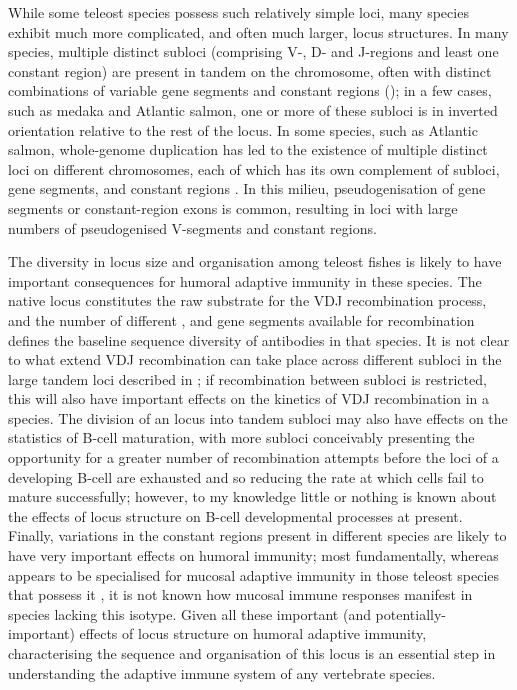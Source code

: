 While some teleost species possess such relatively simple \igh{} loci, many species exhibit much more complicated, and often much larger, locus structures. In many species, multiple distinct subloci (comprising V-, D- and J-regions and least one constant region) are present in tandem on the chromosome, often with distinct combinations of variable gene segments and constant regions (); in a few cases, such as medaka and Atlantic salmon, one or more of these subloci is in inverted orientation relative to the rest of the locus. In some species, such as Atlantic salmon, whole-genome duplication has led to the existence of multiple distinct \igh{} loci on different chromosomes, each of which has its own complement of subloci, gene segments, and constant regions \parencite{yasuike2010salmon}. In this milieu, pseudogenisation of gene segments or constant-region exons is common, resulting in loci with large numbers of pseudogenised V-segments and constant regions.

The diversity in locus size and organisation among teleost fishes is likely to have important consequences for humoral adaptive immunity in these species. The native locus constitutes the raw substrate for the VDJ recombination process, and the number of different \vh, \dh and \jh gene segments available for recombination defines the baseline sequence diversity of antibodies in that species. It is not clear to what extend VDJ recombination can take place across different subloci in the large tandem loci described in ; if recombination between subloci is restricted, this will also have important effects on the kinetics of VDJ recombination in a species. The division of an \igh{} locus into tandem subloci may also have effects on the statistics of B-cell maturation, with more subloci conceivably presenting the opportunity for a greater number of recombination attempts before the \igh{} loci of a developing B-cell are exhausted and so reducing the rate at which cells fail to mature successfully; however, to my knowledge little or nothing is known about the effects of locus structure on B-cell developmental processes at present. Finally, variations in the constant regions present in different species are likely to have very important effects on humoral immunity; most fundamentally, whereas  appears to be specialised for mucosal adaptive immunity in those teleost species that possess it \parencite{zhang2010igtgut,fillatreau2013astonishing,xu2013igtskin}, it is not known how mucosal immune responses manifest in species lacking this isotype. Given all these important (and potentially-important) effects of \igh{} locus structure on humoral adaptive immunity, characterising the sequence and organisation of this locus is an essential step in understanding the adaptive immune system of any vertebrate species.

